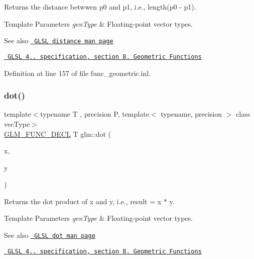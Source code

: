 Returns the distance betwwen p0 and p1, i.\+e., length(p0 -\/ p1).


\begin{DoxyTemplParams}{Template Parameters}
{\em gen\+Type} & Floating-\/point vector types.\\
\hline
\end{DoxyTemplParams}
\begin{DoxySeeAlso}{See also}
\href{http://www.opengl.org/sdk/docs/manglsl/xhtml/distance.xml}{\texttt{ G\+L\+SL distance man page}} 

\href{http://www.opengl.org/registry/doc/GLSLangSpec.4.20.8.pdf}{\texttt{ G\+L\+SL 4.. specification, section 8. Geometric Functions}} 
\end{DoxySeeAlso}


Definition at line 157 of file func\+\_\+geometric.\+inl.

\mbox{\label{group__core__func__geometric_ga7dada304da2ba7dd3376ab4f178c3f6b}} 
\subsubsection{\texorpdfstring{dot()}{dot()}}
{\footnotesize\ttfamily template$<$typename T , precision P, template$<$ typename, precision $>$ class vec\+Type$>$ \\
\mbox{\hyperlink{setup_8hpp_ab2d052de21a70539923e9bcbf6e83a51}{G\+L\+M\+\_\+\+F\+U\+N\+C\+\_\+\+D\+E\+CL}} T glm\+::dot (\begin{DoxyParamCaption}\item[{vec\+Type$<$ T, P $>$ const \&}]{x,  }\item[{vec\+Type$<$ T, P $>$ const \&}]{y }\end{DoxyParamCaption})}

Returns the dot product of x and y, i.\+e., result = x $\ast$ y.


\begin{DoxyTemplParams}{Template Parameters}
{\em gen\+Type} & Floating-\/point vector types.\\
\hline
\end{DoxyTemplParams}
\begin{DoxySeeAlso}{See also}
\href{http://www.opengl.org/sdk/docs/manglsl/xhtml/dot.xml}{\texttt{ G\+L\+SL dot man page}} 

\href{http://www.opengl.org/registry/doc/GLSLangSpec.4.20.8.pdf}{\texttt{ G\+L\+SL 4.. specification, section 8. Geometric Functions}} 
\end{DoxySeeAlso}


